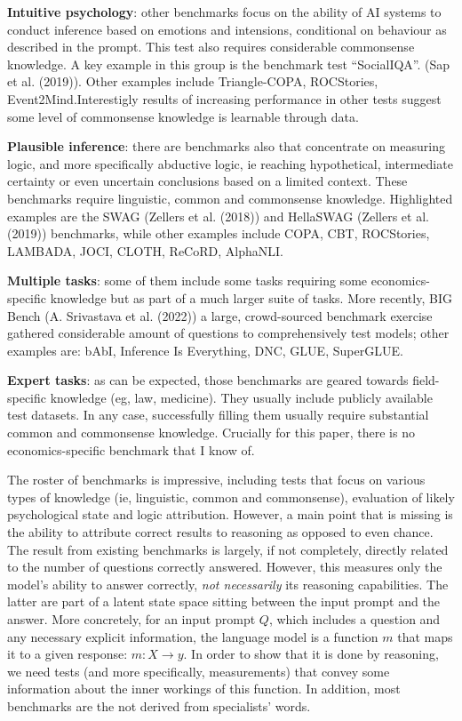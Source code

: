 \documentclass[
]{article}
\begin{document}
\textbf{Intuitive psychology}: other benchmarks focus on the ability of
AI systems to conduct inference based on emotions and intensions,
conditional on behaviour as described in the prompt. This test also
requires considerable commonsense knowledge. A key example in this group
is the benchmark test ``SocialIQA''. (Sap et al. (2019)). Other examples
include Triangle-COPA, ROCStories, Event2Mind.Interestigly results of
increasing performance in other tests suggest some level of commonsense
knowledge is learnable through data.

\textbf{Plausible inference}: there are benchmarks also that concentrate
on measuring logic, and more specifically abductive logic, ie reaching
hypothetical, intermediate certainty or even uncertain conclusions based
on a limited context. These benchmarks require linguistic, common and
commonsense knowledge. Highlighted examples are the SWAG (Zellers et al.
(2018)) and HellaSWAG (Zellers et al. (2019)) benchmarks, while other
examples include COPA, CBT, ROCStories, LAMBADA, JOCI, CLOTH, ReCoRD,
AlphaNLI.

\textbf{Multiple tasks}: some of them include some tasks requiring some
economics-specific knowledge but as part of a much larger suite of
tasks. More recently, BIG Bench (A. Srivastava et al. (2022)) a large,
crowd-sourced benchmark exercise gathered considerable amount of
questions to comprehensively test models; other examples are: bAbI,
Inference Is Everything, DNC, GLUE, SuperGLUE.

\textbf{Expert tasks}: as can be expected, those benchmarks are geared
towards field-specific knowledge (eg, law, medicine). They usually
include publicly available test datasets. In any case, successfully
filling them usually require substantial common and commonsense
knowledge. Crucially for this paper, there is no economics-specific
benchmark that I know of.

The roster of benchmarks is impressive, including tests that focus on
various types of knowledge (ie, linguistic, common and commonsense),
evaluation of likely psychological state and logic attribution. However,
a main point that is missing is the ability to attribute correct results
to reasoning as opposed to even chance. The result from existing
benchmarks is largely, if not completely, directly related to the number
of questions correctly answered. However, this measures only the model's
ability to answer correctly, \emph{not necessarily} its reasoning
capabilities. The latter are part of a latent state space sitting
between the input prompt and the answer. More concretely, for an input
prompt \(Q\), which includes a question and any necessary explicit
information, the language model is a function \(m\) that maps it to a
given response: \(m : X \to y\). In order to show that it is done by
reasoning, we need tests (and more specifically, measurements) that
convey some information about the inner workings of this function. In
addition, most benchmarks are the not derived from specialists' words.
\end{document}

